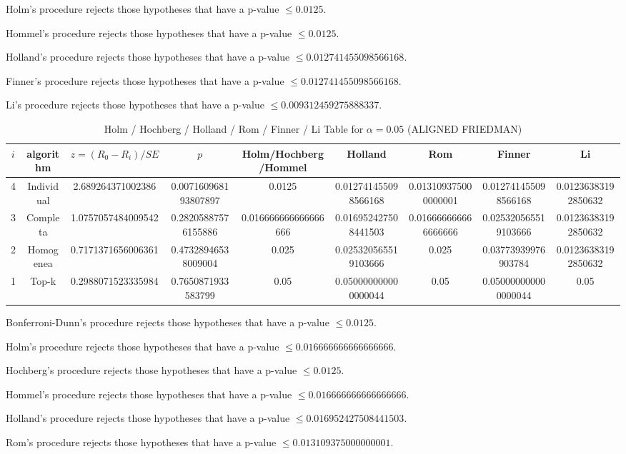 \documentclass[a4paper,10pt]{article}
\begin{document}
\begin{landscape}
Holm's procedure rejects those hypotheses that have a p-value $\le0.0125$.


Hommel's procedure rejects those hypotheses that have a p-value $\le0.0125$.


Holland's procedure rejects those hypotheses that have a p-value $\le0.012741455098566168$.


Finner's procedure rejects those hypotheses that have a p-value $\le0.012741455098566168$.


Li's procedure rejects those hypotheses that have a p-value $\le0.009312459275888337$.



\newpage

\begin{table}[!htp]
\centering\scriptsize
\caption{Holm / Hochberg / Holland / Rom / Finner / Li Table for $\alpha=0.05$ (ALIGNED FRIEDMAN)}
\begin{tabular}{ccccccccc}
$i$&algorithm&$z=(R_0 - R_i)/SE$&$p$&Holm/Hochberg/Hommel&Holland&Rom&Finner&Li\\
\hline
4&Individual&2.689264371002386&0.007160968193807897&0.0125&0.012741455098566168&0.013109375000000001&0.012741455098566168&0.01236383192850632\\
3&Completa&1.0757057484009542&0.28205887576155886&0.016666666666666666&0.016952427508441503&0.016666666666666666&0.025320565519103666&0.01236383192850632\\
2&Homogenea&0.7171371656006361&0.47328946538009004&0.025&0.025320565519103666&0.025&0.03773939976903784&0.01236383192850632\\
1&Top-k&0.2988071523335984&0.7650871933583799&0.05&0.050000000000000044&0.05&0.050000000000000044&0.05\\
\hline
\end{tabular}
\end{table}
Bonferroni-Dunn's procedure rejects those hypotheses that have a p-value $\le0.0125$.


Holm's procedure rejects those hypotheses that have a p-value $\le0.016666666666666666$.


Hochberg's procedure rejects those hypotheses that have a p-value $\le0.0125$.


Hommel's procedure rejects those hypotheses that have a p-value $\le0.016666666666666666$.


Holland's procedure rejects those hypotheses that have a p-value $\le0.016952427508441503$.


Rom's procedure rejects those hypotheses that have a p-value $\le0.013109375000000001$.



\end{landscape}
\end{document}

